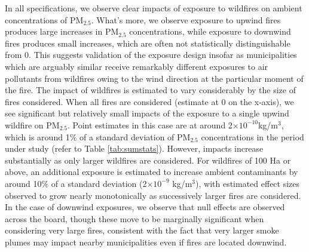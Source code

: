 \documentclass[11pt]{article}
\begin{document}
\begin{spacing}{1.5}
In all specifications, we observe clear impacts of exposure to wildfires on ambient concentrations of PM$_{2.5}$.  What's more, we observe exposure to upwind fires produces large increases in PM$_{2.5}$ concentrations, while exposure to downwind fires produces small increases, which are often not statistically distinguishable from 0. This suggests validation of the exposure design insofar as municipalities which are arguably similar receive remarkably different exposures to air pollutants from wildfires owing to the wind direction at the particular moment of the fire. The impact of wildfires is estimated to vary considerably by the size of fires considered.  When all fires are considered (estimate at 0 on the x-axis), we see significant but relatively small impacts of the exposure to a single upwind wildfire on PM$_{2.5}$.  Point estimates in this case are at around 2$\times10^{-10} $kg/m$^3$, which is around 1\% of a standard deviation of PM$_{2.5}$ concentrations in the period under study (refer to Table \ref{tab:sumstats}).  However, impacts increase substantially as only larger wildfires are considered.  For wildfires of 100 Ha or above, an additional exposure is estimated to increase ambient contaminants by around 10\% of a standard deviation (2$\times10^{-9}$ kg/m$^3$), with estimated effect sizes observed to grow nearly monotonically as successively larger fires are considered.  In the case of downwind exposures, we observe that null effects are observed across the board, though these move to be marginally significant when considering very large fires, consistent with the fact that very larger smoke plumes may impact nearby municipalities even if fires are located downwind.





\end{spacing}
\end{document}
